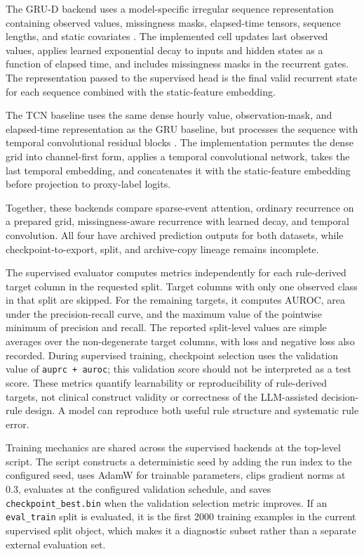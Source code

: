 The GRU-D backend uses a model-specific irregular sequence representation containing observed values, missingness masks, elapsed-time tensors, sequence lengths, and static covariates \cite{che2018grud}.  The implemented cell updates last observed values, applies learned exponential decay to inputs and hidden states as a function of elapsed time, and includes missingness masks in the recurrent gates.  The representation passed to the supervised head is the final valid recurrent state for each sequence combined with the static-feature embedding.

The TCN baseline uses the same dense hourly value, observation-mask, and elapsed-time representation as the GRU baseline, but processes the sequence with temporal convolutional residual blocks \cite{bai2018tcn}.  The implementation permutes the dense grid into channel-first form, applies a temporal convolutional network, takes the last temporal embedding, and concatenates it with the static-feature embedding before projection to proxy-label logits.

Together, these backends compare sparse-event attention, ordinary recurrence on a prepared grid, missingness-aware recurrence with learned decay, and temporal convolution.  All four have archived prediction outputs for both datasets, while checkpoint-to-export, split, and archive-copy lineage remains incomplete.

The supervised evaluator computes metrics independently for each rule-derived target column in the requested split.  Target columns with only one observed class in that split are skipped.  For the remaining targets, it computes AUROC, area under the precision-recall curve, and the maximum value of the pointwise minimum of precision and recall.  The reported split-level values are simple averages over the non-degenerate target columns, with loss and negative loss also recorded.  During supervised training, checkpoint selection uses the validation value of \texttt{auprc + auroc}; this validation score should not be interpreted as a test score.  These metrics quantify learnability or reproducibility of rule-derived targets, not clinical construct validity or correctness of the LLM-assisted decision-rule design.  A model can reproduce both useful rule structure and systematic rule error.

Training mechanics are shared across the supervised backends at the top-level script.  The script constructs a deterministic seed by adding the run index to the configured seed, uses AdamW for trainable parameters, clips gradient norms at 0.3, evaluates at the configured validation schedule, and saves \texttt{checkpoint\_best.bin} when the validation selection metric improves.  If an \texttt{eval\_train} split is evaluated, it is the first 2000 training examples in the current supervised split object, which makes it a diagnostic subset rather than a separate external evaluation set.

